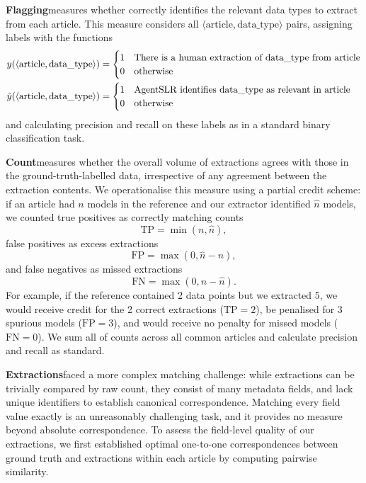 \medskip
\noindent\textbf{Flagging}\enskip measures whether \name{} correctly identifies the relevant data types to extract from each article. This measure considers all $\langle\mathrm{article}, \mathrm{data\_type}\rangle$ pairs, assigning labels with the functions
\begin{subequations}\label{eq:flagging}
\begin{align*}
    y(\langle\mathrm{article}, \mathrm{data\_type}\rangle) &= \begin{cases}
        1 & \text{There is a human extraction of }\mathrm{data\_type}\text{ from }\mathrm{article} \\
        0 & \text{otherwise}
    \end{cases} \\
    \hat{y}(\langle\mathrm{article}, \mathrm{data\_type}\rangle) &= \begin{cases}
        1 & \text{AgentSLR{} identifies }\mathrm{data\_type}\text{ as relevant in }\mathrm{article} \\
        0 & \text{otherwise}
    \end{cases}
\end{align*}
\end{subequations}
and calculating precision and recall on these labels as in a standard binary classification task.

\medskip
\noindent\textbf{Count}\enskip measures whether the overall volume of \name{} extractions agrees with those in the ground-truth-labelled data, irrespective of any agreement between the extraction contents. We operationalise this measure using a partial credit scheme: if an article had $n$ models in the reference and our extractor identified $\hat{n}$ models, we counted true positives as correctly matching counts
$$\mathrm{TP} = \min(n, \hat{n}),$$
false positives as excess extractions
$$\mathrm{FP} = \max(0, \hat{n} - n),$$
and false negatives as missed extractions
$$\mathrm{FN} = \max(0, n - \hat{n}).$$
For example, if the reference contained 2 data points but we extracted 5, we would receive credit for the 2 correct extractions ($\mathrm{TP}=2$), be penalised for 3 spurious models ($\mathrm{FP}=3$), and would receive no penalty for missed models ($\mathrm{FN}=0$). We sum all of counts across all common articles and calculate precision and recall as standard.

\medskip
\noindent\textbf{Extractions}\enskip faced a more complex matching challenge: while extractions can be trivially compared by raw count, they consist of many metadata fields, and lack unique identifiers to establish canonical correspondence. Matching every field value exactly is an unreasonably challenging task, and it provides no measure beyond absolute correspondence. To assess the field-level quality of our extractions, we first established optimal one-to-one correspondences between ground truth and \name{} extractions within each article by computing pairwise similarity.

